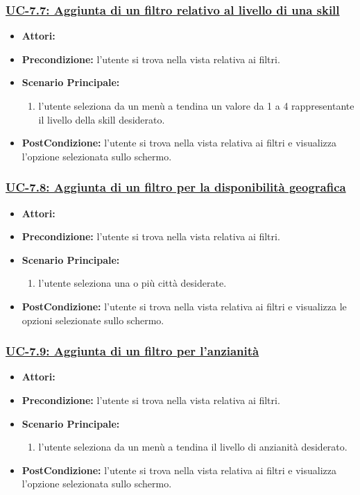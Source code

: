 \subsubsection{\underline{UC-7.7: Aggiunta di un filtro relativo al livello di una skill}}
\begin{itemize}
	\item \textbf{Attori:}\loggedusr
	\item \textbf{Precondizione:} l'utente si trova nella vista relativa ai filtri.
	\item \textbf{Scenario Principale:}
	\begin{enumerate}
		\item l'utente seleziona da un menù a tendina un valore da 1 a 4 rappresentante il livello della skill desiderato.
	\end{enumerate}
	\item \textbf{PostCondizione:}  l'utente si trova nella vista relativa ai filtri e visualizza l'opzione selezionata sullo schermo.
\end{itemize}


\subsubsection{\underline{UC-7.8: Aggiunta di un filtro per la disponibilità geografica}}
\begin{itemize}
	\item \textbf{Attori:}\loggedusr
	\item \textbf{Precondizione:} l'utente si trova nella vista relativa ai filtri.
	\item \textbf{Scenario Principale:}
	\begin{enumerate}
		\item l'utente seleziona una o più città desiderate.
	\end{enumerate}
	\item \textbf{PostCondizione:}  l'utente si trova nella vista relativa ai filtri e visualizza le opzioni selezionate sullo schermo.
\end{itemize}

\subsubsection{\underline{UC-7.9: Aggiunta di un filtro per l'anzianità}}
\begin{itemize}
	\item \textbf{Attori:}\loggedusr
	\item \textbf{Precondizione:} l'utente si trova nella vista relativa ai filtri.
	\item \textbf{Scenario Principale:}
	\begin{enumerate}
		\item l'utente seleziona da un menù a tendina il livello di anzianità desiderato.
	\end{enumerate}
	\item \textbf{PostCondizione:}  l'utente si trova nella vista relativa ai filtri e visualizza l'opzione selezionata sullo schermo.
\end{itemize}

